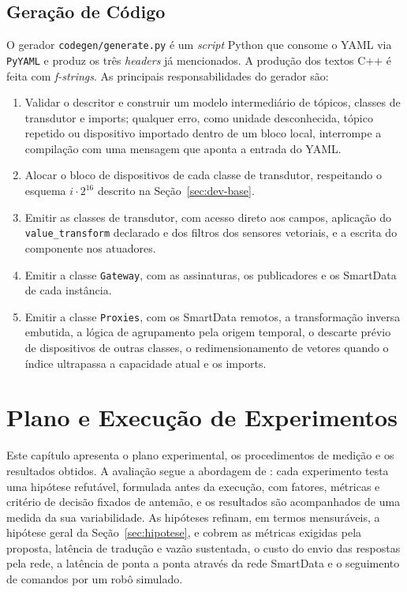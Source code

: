 \documentclass[
    12pt,
    oneside,
    a4paper,
    chapter=TITLE,
    section=TITLE,
    english,
    brazil
]{abntex2}
\begin{document}
\section{Geração de Código}
\label{sec:codegen-impl}

O gerador \texttt{codegen/generate.py} é um \textit{script} Python que consome
o YAML via \texttt{PyYAML} e produz os três \textit{headers} já mencionados. A
produção dos textos C++ é feita com \textit{f-strings}. As principais
responsabilidades do gerador são:

\begin{enumerate}
    \item Validar o descritor e construir um modelo intermediário de
    tópicos, classes de transdutor e imports; qualquer erro, como unidade
    desconhecida, tópico repetido ou
    dispositivo importado dentro de um bloco local, interrompe a
    compilação com uma mensagem que aponta a entrada do YAML.
    \item Alocar o bloco de dispositivos de cada classe de transdutor,
    respeitando o esquema \(i \cdot 2^{16}\) descrito na
    Seção~\ref{sec:dev-base}.
    \item Emitir as classes de transdutor, com acesso direto aos campos,
    aplicação do \texttt{value\_transform} declarado e dos filtros dos
    sensores vetoriais, e a escrita do componente nos atuadores.
    \item Emitir a classe \texttt{Gateway}, com as assinaturas, os
    publicadores e os SmartData de cada instância.
    \item Emitir a classe \texttt{Proxies}, com os SmartData remotos, a
    transformação inversa embutida, a lógica de agrupamento pela origem
    temporal, o descarte prévio de dispositivos de outras classes, o
    redimensionamento de vetores quando o índice ultrapassa a capacidade
    atual e os imports.
\end{enumerate}

\chapter{Plano e Execução de Experimentos}
\label{cap:experimentos}

Este capítulo apresenta o plano experimental, os procedimentos de medição
e os resultados obtidos. A avaliação segue a abordagem de
: cada experimento testa uma hipótese refutável,
formulada antes da execução, com fatores, métricas e critério de decisão
fixados de antemão, e os resultados são acompanhados de uma medida da sua
variabilidade. As hipóteses refinam, em termos mensuráveis, a hipótese
geral da Seção~\ref{sec:hipotese}, e cobrem as métricas exigidas pela
proposta, latência de tradução e vazão sustentada, o custo do envio das
respostas pela rede, a latência de ponta a ponta através da rede SmartData
e o seguimento de comandos por um robô simulado.
\end{document}
